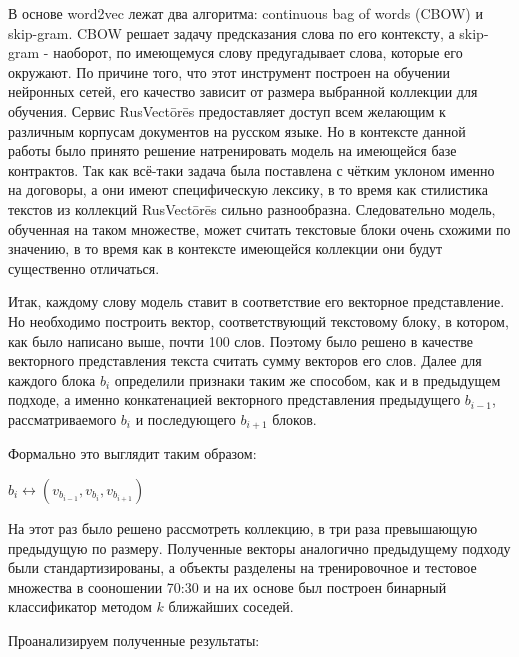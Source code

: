 \documentclass[12pt]{article}
\newcounter{c_tab}
\begin{document}
В основе word2vec лежат два алгоритма: continuous bag of words (CBOW) и skip-gram. CBOW решает задачу предсказания слова по его контексту, а skip-gram - наоборот, по имеющемуся слову предугадывает слова, которые его окружают. По причине того, что этот инструмент построен на обучении нейронных сетей, его качество зависит от размера выбранной коллекции для обучения. Сервис RusVectōrēs предоставляет доступ всем желающим к различным корпусам документов на русском языке. Но в контексте данной работы было принято решение натренировать модель на имеющейся базе контрактов. Так как всё-таки задача была поставлена с чётким уклоном именно на договоры, а они имеют специфическую лексику, в то время как стилистика текстов из коллекций RusVectōrēs сильно разнообразна. Следовательно модель, обученная на таком множестве, может считать текстовые блоки очень схожими по значению, в то время как в контексте имеющейся коллекции они будут существенно отличаться. 

Итак, каждому слову модель ставит в соответствие его векторное представление. Но необходимо построить вектор, соответствующий текстовому блоку, в котором, как было написано выше, почти 100 слов. Поэтому было решено в качестве векторного представления текста считать сумму векторов его слов. Далее для каждого блока $b_i$ определили признаки таким же способом, как и в предыдущем подходе, а именно конкатенацией векторного представления предыдущего $b_{i-1}$, рассматриваемого $b_i$ и последующего $b_{i+1}$ блоков. 

Формально это выглядит таким образом:

\begin{center}
	$b_i \leftrightarrow (v_{b_{i-1}}, v_{b_i}, v_{b_{i+1}})$
\end{center}

На этот раз было решено рассмотреть коллекцию, в три раза превышающую предыдущую по размеру. Полученные векторы аналогично предыдущему подходу были стандартизированы, а объекты разделены на тренировочное и тестовое множества в сооношении 70:30 и на их основе был построен бинарный классификатор методом $k$ ближайших соседей.

Проанализируем полученные результаты:
\end{document}
